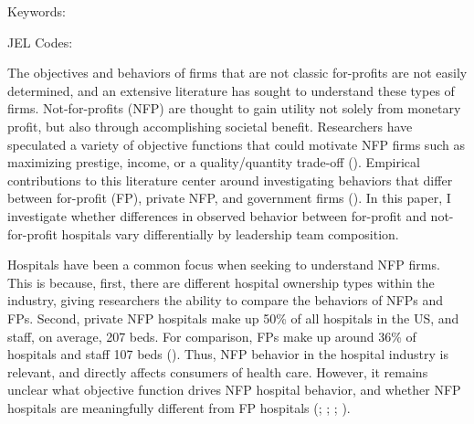 \documentclass[12pt]{article}
\begin{document}
	
	
	
	\vspace{0.8in}
	
	\noindent Keywords: 
	
	\noindent JEL Codes: 
	
	\onehalfspacing
	
	\newpage

  The objectives and behaviors of firms that are not classic for-profits are not easily determined, and an extensive literature has sought to understand these types of firms. Not-for-profits (NFP) are thought to gain utility not solely from monetary profit, but also through accomplishing societal benefit. Researchers have speculated a variety of objective functions that could motivate NFP firms such as maximizing prestige, income, or a quality/quantity trade-off (\cite{steinberg1986revealed}). Empirical contributions to this literature center around investigating behaviors that differ between for-profit (FP), private NFP, and government firms (\cite{sloan2000not}). In this paper, I investigate whether differences in observed behavior between for-profit and not-for-profit hospitals vary differentially by leadership team composition. 
  
  Hospitals have been a common focus when seeking to understand NFP firms. This is because, first, there are different hospital ownership types within the industry, giving researchers the ability to compare the behaviors of NFPs and FPs. Second, private NFP hospitals make up 50\% of all hospitals in the US, and staff, on average, 207 beds. For comparison, FPs make up around 36\% of hospitals and staff 107 beds (\cite{ASPE_2023}). Thus, NFP behavior in the hospital industry is relevant, and directly affects consumers of health care. However, it remains unclear what objective function drives NFP hospital behavior, and whether NFP hospitals are meaningfully different from FP hospitals (\cite{sloan2000not}; \cite{erus2002inferring}; \cite{deneffe2002not}; \cite{horwitz2009hospital}). 
  
\end{document}
